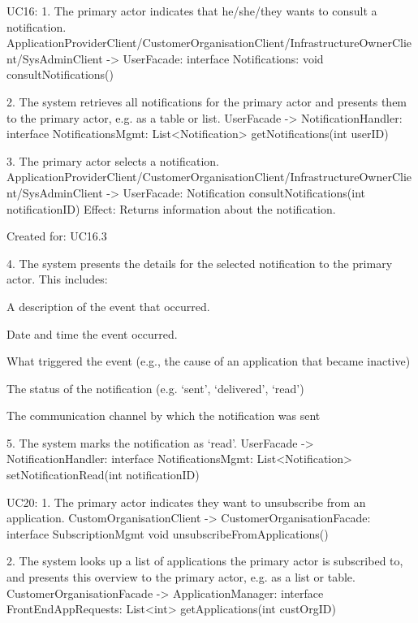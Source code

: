 {{{     UC16:
     1. The primary actor indicates that he/she/they wants to consult a notification.
            ApplicationProviderClient/CustomerOrganisationClient/InfrastructureOwnerClient/SysAdminClient -> UserFacade:
                    interface Notifications: void consultNotifications()
            
     2. The system retrieves all notifications for the primary actor and presents them to the primary
        actor, e.g. as a table or list.
        UserFacade -> NotificationHandler: interface NotificationsMgmt:
                List<Notification> getNotifications(int userID)
             
                
     3. The primary actor selects a notification.
            ApplicationProviderClient/CustomerOrganisationClient/InfrastructureOwnerClient/SysAdminClient -> UserFacade:
                                Notification consultNotifications(int notificationID)
            Effect: Returns information about the notification.
            \item Created for: UC16.3
            
                                
            
     4. The system presents the details for the selected notification to the primary actor. This includes:
        { A description of the event that occurred.
        { Date and time the event occurred.
        { What triggered the event (e.g., the cause of an application that became inactive)
        { The status of the notification (e.g. `sent', `delivered', `read')
        { The communication channel by which the notification was sent
        
        
     5. The system marks the notification as `read'.
     UserFacade -> NotificationHandler: interface NotificationsMgmt:
                List<Notification> setNotificationRead(int notificationID)
     
     UC20:
        1. The primary actor indicates they want to unsubscribe from an application.
            CustomOrganisationClient -> CustomerOrganisationFacade: interface SubscriptionMgmt
                                              void  unsubscribeFromApplications()
                 
                                                
        2. The system looks up a list of applications the primary actor is subscribed to, and presents this
            overview to the primary actor, e.g. as a list or table.
            CustomerOrganisationFacade -> ApplicationManager: interface FrontEndAppRequests:
                                             List<int> getApplications(int custOrgID)  
                                             
}}}}}}}}
